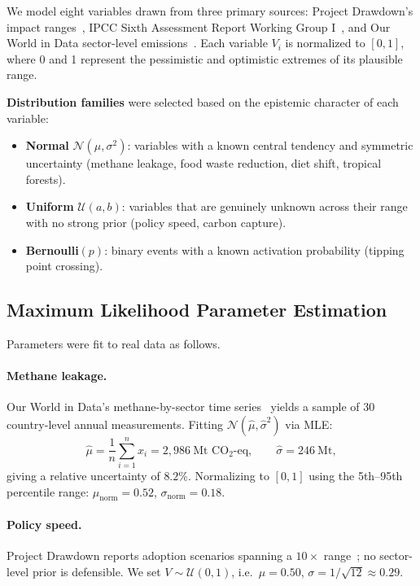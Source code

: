 \documentclass[10pt,twocolumn]{article}
\begin{document}
We model eight variables drawn from three primary sources:
Project Drawdown's impact ranges~\cite{drawdown2026},
IPCC Sixth Assessment Report Working Group I~\cite{ipcc_ar6},
and Our World in Data sector-level emissions~\cite{owid_methane,owid_energy}.
Each variable $V_i$ is normalized to $[0,1]$, where 0 and 1 represent
the pessimistic and optimistic extremes of its plausible range.

\vspace{2pt}
\noindent\textbf{Distribution families} were selected based on the
epistemic character of each variable:

\begin{itemize}[leftmargin=*,itemsep=1pt]
  \item \textbf{Normal} $\mathcal{N}(\mu,\sigma^2)$: variables with
  a known central tendency and symmetric uncertainty
  (methane leakage, food waste reduction, diet shift, tropical forests).
  \item \textbf{Uniform} $\mathcal{U}(a,b)$: variables that are
  genuinely unknown across their range with no strong prior
  (policy speed, carbon capture).
  \item \textbf{Bernoulli}$(p)$: binary events with a known activation
  probability (tipping point crossing).
\end{itemize}

\subsection{Maximum Likelihood Parameter Estimation}

Parameters were fit to real data as follows.

\paragraph{Methane leakage.}
Our World in Data's methane-by-sector time series~\cite{owid_methane}
yields a sample of 30 country-level annual measurements.
Fitting $\mathcal{N}(\hat\mu,\hat\sigma^2)$ via MLE:
\[
  \hat\mu = \frac{1}{n}\sum_{i=1}^n x_i = 2{,}986\ \text{Mt CO}_2\text{-eq},
  \qquad
  \hat\sigma = 246\ \text{Mt},
\]
giving a relative uncertainty of $8.2\%$.  Normalizing to $[0,1]$
using the 5th--95th percentile range: $\mu_{\text{norm}}=0.52$,
$\sigma_{\text{norm}}=0.18$.

\paragraph{Policy speed.}
Project Drawdown reports adoption scenarios spanning a $10\times$
range~\cite{drawdown2026}; no sector-level prior is defensible.
We set $V \sim \mathcal{U}(0,1)$, i.e.\ $\mu=0.50$, $\sigma=1/\!\sqrt{12}\approx0.29$.
\end{document}
